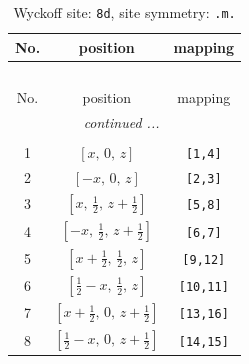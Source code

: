 \documentclass[fleqn,8pt]{jsarticle}
\begin{document}
\begin{longtable}{ccc}
\caption{Wyckoff site: {\tt 8d}, site symmetry: {\tt .m.}}
 \\
 \hline \hline
No. & position & mapping \\ \hline \endfirsthead

\multicolumn{2}{l}{\tablename\ \thetable{}} \\
 \hline \hline
No. & position & mapping \\ \hline \endhead

 \hline \hline
\multicolumn{2}{r}{\footnotesize\it continued ...} \\ \endfoot

 \hline \hline
\multicolumn{2}{r}{} \\ \endlastfoot

1 & $\left[ x,\, 0,\, z \right]$ & {\tt [1,4]} \\ \hline
2 & $\left[ - x,\, 0,\, z \right]$ & {\tt [2,3]} \\ \hline
3 & $\left[ x,\, \frac{1}{2},\, z + \frac{1}{2} \right]$ & {\tt [5,8]} \\ \hline
4 & $\left[ - x,\, \frac{1}{2},\, z + \frac{1}{2} \right]$ & {\tt [6,7]} \\ \hline
5 & $\left[ x + \frac{1}{2},\, \frac{1}{2},\, z \right]$ & {\tt [9,12]} \\ \hline
6 & $\left[ \frac{1}{2} - x,\, \frac{1}{2},\, z \right]$ & {\tt [10,11]} \\ \hline
7 & $\left[ x + \frac{1}{2},\, 0,\, z + \frac{1}{2} \right]$ & {\tt [13,16]} \\ \hline
8 & $\left[ \frac{1}{2} - x,\, 0,\, z + \frac{1}{2} \right]$ & {\tt [14,15]} \\
\end{longtable}
\renewcommand{\arraystretch}{1.2}
\end{document}
